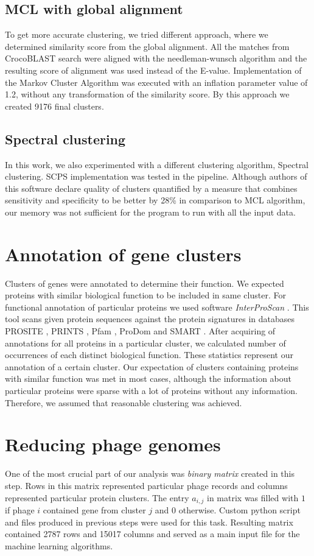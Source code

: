 \subsection{MCL with global alignment}
To get more accurate clustering, we tried different approach, where we determined similarity score from the global alignment.
All the matches from CrocoBLAST search were aligned with the needleman-wunsch algorithm \cite{needleman-wunsch} and the resulting score of alignment was used instead of the E-value.
Implementation of the Markov Cluster Algorithm was executed with an inflation parameter value of 1.2, without any transformation of the similarity score.
By this approach we created 9176 final clusters.

\subsection{Spectral clustering}
In this work, we also experimented with a different clustering algorithm, Spectral clustering.
SCPS implementation\cite{scps} was tested in the pipeline.
Although authors of this software declare quality of clusters quantified by a measure that combines sensitivity and specificity to be better by 28\% in comparison to MCL algorithm, our memory was not sufficient for the program to run with all the input data.

\section{Annotation of gene clusters}
Clusters of genes were annotated to determine their function.
We expected proteins with similar biological function to be included in same cluster.
For functional annotation of particular proteins we used software \emph{InterProScan} \cite{interpro}.
This tool scans given protein sequences against the protein signatures in databases PROSITE \cite{prosite}, PRINTS \cite{prints}, Pfam \cite{pfam}, ProDom \cite{prodom} and SMART \cite{smart}.
After acquiring of annotations for all proteins in a particular cluster, we calculated number of occurrences of each distinct biological function.
These statistics represent our annotation of a certain cluster.
Our expectation of clusters containing proteins with similar function was met in most cases, although the information about particular proteins were sparse with a lot of proteins without any information.
Therefore, we assumed that reasonable clustering was achieved.

\section{Reducing phage genomes}
One of the most crucial part of our analysis was \emph{binary matrix} created in this step.
Rows in this matrix represented particular phage records and columns represented particular protein clusters.
The entry $a_{i,j}$ in matrix was filled with $1$ if phage $i$ contained gene from cluster $j$ and $0$ otherwise.
Custom python script and files produced in previous steps were used for this task.
Resulting matrix contained 2787 rows and 15017 columns and served as a main input file for the machine learning algorithms.